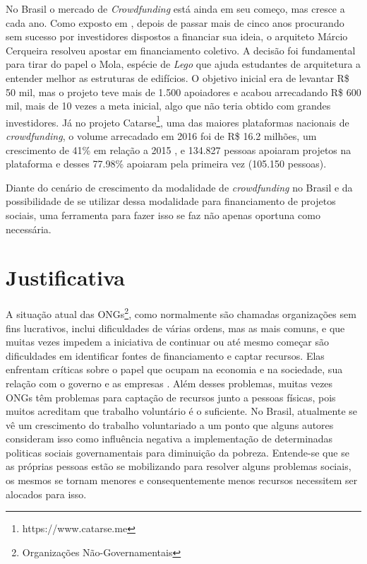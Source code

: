No Brasil o mercado de \emph{Crowdfunding} está ainda em seu começo, mas cresce a cada ano. Como exposto em \cite{globo-financiamento}, depois de passar mais de cinco anos procurando sem sucesso por investidores dispostos a financiar sua ideia, o arquiteto Márcio Cerqueira resolveu apostar em financiamento coletivo. A decisão foi fundamental para tirar do papel o Mola, espécie de \emph{Lego} que ajuda estudantes de arquitetura a entender melhor as estruturas de edifícios. O objetivo inicial era de levantar R\$ 50 mil, mas o projeto teve mais de 1.500 apoiadores e acabou arrecadando R\$ 600 mil, mais de 10 vezes a meta inicial, algo que não teria obtido com grandes investidores. Já no projeto Catarse\footnote{https://www.catarse.me}, uma das maiores plataformas nacionais de \emph{crowdfunding}, o volume arrecadado em 2016 foi de R\$ 16.2 milhões, um crescimento de 41\% em relação a 2015 \cite{catarse-retrospectiva2016}, e 134.827 pessoas apoiaram projetos na plataforma e desses 77.98\% apoiaram pela primeira vez (105.150 pessoas).

Diante do cenário de crescimento da modalidade de \emph{crowdfunding} no Brasil e da possibilidade de se utilizar dessa modalidade para financiamento de projetos sociais, uma ferramenta para fazer isso se faz não apenas oportuna como necessária.



\section{Justificativa}
A situação atual das ONGs\footnote{Organizações Não-Governamentais}, como normalmente são chamadas organizações sem fins lucrativos, inclui dificuldades de várias ordens, mas as mais comuns, e que muitas vezes impedem a iniciativa de continuar ou até mesmo começar são dificuldades em identificar fontes de financiamento e captar recursos. Elas enfrentam críticas sobre o papel que ocupam na economia e na sociedade, sua relação com o governo e as empresas \cite{GOUVEIA2007}. Além desses problemas, muitas vezes ONGs têm problemas para captação de recursos junto a pessoas físicas, pois muitos acreditam que trabalho voluntário é o suficiente. No Brasil, atualmente se vê um crescimento do trabalho voluntariado a um ponto que alguns autores \cite{fagundes2012repercussoes} consideram isso como influência negativa a implementação de determinadas politicas sociais governamentais para diminuição da pobreza. Entende-se que se as próprias pessoas estão se mobilizando para resolver alguns problemas sociais, os mesmos se tornam menores e consequentemente menos recursos necessitem ser alocados para isso.

